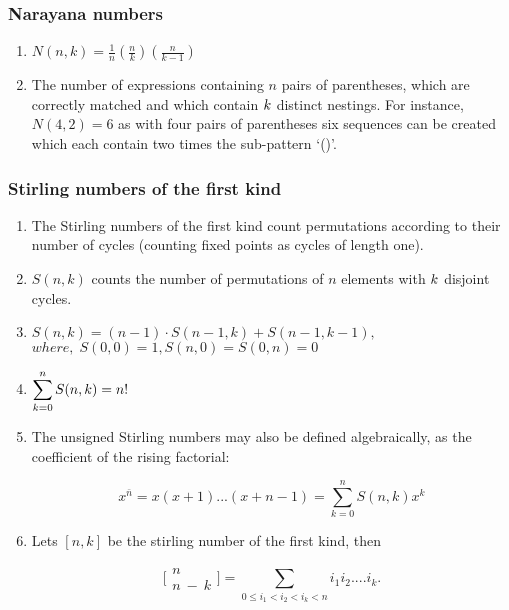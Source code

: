 \subsubsection{Narayana numbers}\begin{enumerate}

            
            \item $N(n,k)=\frac{1}{n}\left(\frac{n}{k}\right)\left(\frac{n}{k-1}\right)$
            \item 
                The number of expressions containing $n$ pairs of parentheses, which are correctly matched and which
                    contain
                    $\displaystyle \displaystyle k$ distinct nestings. For instance, $N(4, 2) = 6$ as with four pairs of
                    parentheses six sequences can be created which each contain two times the sub-pattern ‘()’.

                \end{enumerate}
\subsubsection{Stirling numbers of the first kind}\begin{enumerate}

            
            \item The Stirling numbers of the first kind count permutations according to their number of cycles (counting
                fixed
                points as cycles of length one).
            \item $S(n,k)$ counts the number of permutations of $n$ elements with $\displaystyle \displaystyle k$ disjoint
                cycles.
            
            \item $S(n,k)=(n-1) \cdot S(n-1,k)+S(n-1,k-1),$
                \(where,\; S(0,0)=1,S(n,0)=S(0,n)=0\)
            \item $\displaystyle \displaystyle\sum_{k=0}^{n}S(n,k) = n!$
            \item 
                The unsigned Stirling numbers may also be defined algebraically, as the coefficient of the rising
                    factorial:
                

                \[\displaystyle x^{\bar{n}} = x(x+1)...(x+n-1) = \sum_{k=0}^{n}{ S(n, k) x^k}\]
            
            \item 
                Lets $[n, k]$ be the stirling number of the first kind, then

                \[\displaystyle \bigl[\!\begin{smallmatrix} n \\ n\ -\ k \end{smallmatrix}\!\bigr] = \sum_{0 \leq i_1
                <
                i_2
                < i_k < n}{i_1i_2....i_k.}\]
                \end{enumerate}
